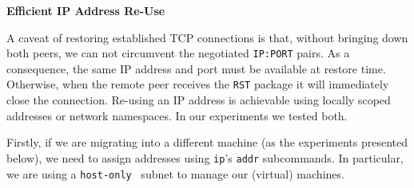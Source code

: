 \textbf{Efficient IP Address Re-Use}

A caveat of restoring established TCP connections is that, without bringing
down both peers, we can not circumvent the negotiated \texttt{IP:PORT} pairs.
As a consequence, the same IP address and port must be available at restore
time.
Otherwise, when the remote peer receives the \texttt{RST} package it will
immediately close the connection.
Re-using an IP address is achievable using locally scoped addresses or network
namespaces.
In our experiments we tested both.

Firstly, if we are migrating into a different machine (as the experiments
presented below), we need to assign addresses using \texttt{ip}'s \texttt{addr}
subcommands.
In particular, we are using a \texttt{host-only}~\cite{vbox-hostonly} subnet to
manage our (virtual) machines.

